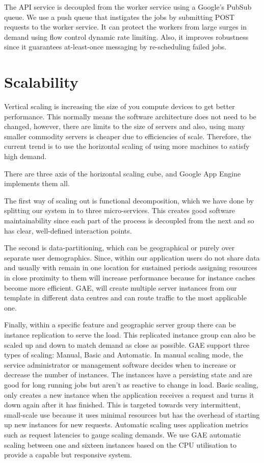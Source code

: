 \documentclass[conference]{IEEEtran}
\begin{document}
The API service is decoupled from the worker service using a Google's PubSub queue. We use a push queue that instigates the jobs by submitting POST requests to the worker service. It can protect the workers from large surges in demand using flow control dynamic rate limiting. Also, it improves robustness since it guarantees at-least-once messaging by re-scheduling failed jobs.

\section{Scalability}

Vertical scaling is increasing the size of you compute devices to get better performance. This normally means the software architecture does not need to be changed, however, there are limits to the size of servers and also, using many smaller commodity servers is cheaper due to efficiencies of scale. Therefore, the current trend is to use the horizontal scaling of using more machines to satisfy high demand.

There are three axis of the horizontal scaling cube, and Google App Engine
implements them all.

The first way of scaling out is functional decomposition, which we have done by splitting our system in to three micro-services. This creates good software maintainability since each part of the process is decoupled from the next and so has clear, well-defined interaction points.

The second is data-partitioning, which can be geographical or purely over separate user demographics. Since, within our application users do not share data and usually with remain in one location for sustained periods assigning resources in close proximity to them will increase performance because for instance caches become more efficient. GAE, will create multiple server instances from our template in different data centres and can route traffic to the most applicable one. 

Finally, within a specific feature and geographic server group there can be
instance replication to serve the load. This replicated instance group can also
be scaled up and down to match demand as close as possible. GAE support three
types of scaling: Manual, Basic and Automatic. In manual scaling mode, the
service administrator or management software decides when to increase or
decrease the number of instances. The instances have a persisting state and are
good for long running jobs but aren't as reactive to change in load. Basic
scaling, only creates a new instance when the application receives a request and
turns it down again after it has finished. This is targeted towards very
intermittent, small-scale use because it uses minimal resources but has the
overhead of starting up new instances for new requests. Automatic scaling uses application metrics such as request latencies to gauge scaling demands. We use GAE automatic scaling between one and sixteen instances based on the CPU utilisation to provide a capable but responsive system.
\end{document}
